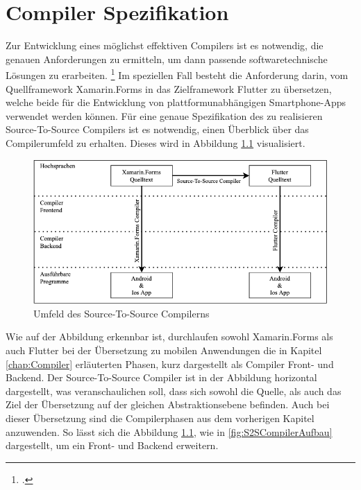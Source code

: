 \chapter{Compiler Spezifikation}
\label{chap:CompilerEntwurf}
Zur Entwicklung eines möglichst effektiven Compilers ist es notwendig, die genauen Anforderungen zu ermitteln,  um dann passende softwaretechnische Lösungen zu erarbeiten. \footcite[Vgl.][S.6]{Balzert2011} Im speziellen Fall besteht die Anforderung darin, vom Quellframework Xamarin.Forms in das Zielframework Flutter zu übersetzen,  welche beide für die Entwicklung von plattformunabhängigen Smartphone-Apps verwendet werden können.  Für eine genaue Spezifikation des zu realisieren Source-To-Source Compilers ist es notwendig, einen Überblick über das Compilerumfeld zu erhalten.  Dieses wird in Abbildung \ref{fig:CompilerArchitecture} visualisiert. 

\begin{figure}[!ht]
 \includegraphics[width=\textwidth,keepaspectratio]{Images/CompilerArchitecture/CompilerStructure.png}
 \caption{Umfeld des Source-To-Source Compilerns}
 \label{fig:CompilerArchitecture}
\end{figure}

Wie auf der Abbildung erkennbar ist,  durchlaufen sowohl Xamarin.Forms als auch Flutter bei der Übersetzung zu mobilen Anwendungen die in Kapitel \ref{chap:Compiler} erläuterten Phasen,  kurz dargestellt als Compiler Front- und Backend.  Der Source-To-Source Compiler ist in der Abbildung horizontal dargestellt,  was veranschaulichen soll,  dass sich sowohl die Quelle,  als auch das Ziel der Übersetzung auf der gleichen Abstraktionsebene befinden.  Auch bei dieser Übersetzung sind die Compilerphasen aus dem vorherigen Kapitel anzuwenden.  So lässt sich die Abbildung \ref{fig:CompilerArchitecture},  wie in \ref{fig:S2SCompilerAufbau} dargestellt, um ein Front- und Backend erweitern.

